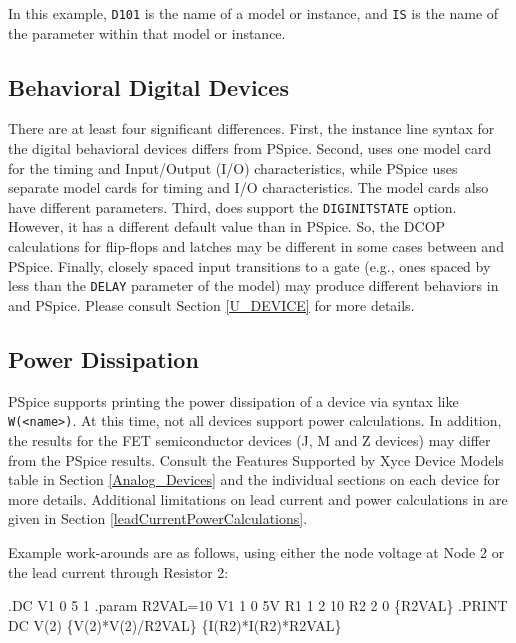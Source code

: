 In this example, \texttt{D101} is the name of a model or instance, 
and \texttt{IS} is the name of the parameter within that model or instance.

\subsection{Behavioral Digital Devices}
There are at least four significant differences.  First, the instance line
syntax for the \Xyce{} digital behavioral devices differs from PSpice.
Second,  \Xyce{} uses one model card for the timing and Input/Output (I/O)
characteristics, while PSpice uses separate model cards for timing and I/O
characteristics.  The model cards also have different parameters. 
Third, \Xyce{} does support the \texttt{DIGINITSTATE} option. However, it has a
different default value than in PSpice.  So, the DCOP calculations for flip-flops and latches may
be different in some cases between \Xyce{} and PSpice.  Finally, closely spaced input
transitions to a gate (e.g., ones spaced by less than the \texttt{DELAY}
parameter of the \Xyce{} model) may produce different behaviors in \Xyce{}
and PSpice.  Please consult Section \ref{U_DEVICE} for more details.

\subsection{Power Dissipation}
PSpice supports printing the power dissipation of a device via syntax like
\texttt{W(<name>)}.  At this time, not all \Xyce{} devices support power calculations. 
In addition, the \Xyce{} results for the FET semiconductor devices (J, M and Z devices) may 
differ from the PSpice results.  Consult the Features Supported by Xyce Device Models table
in Section \ref{Analog_Devices} and the individual sections on each device for more details.  
Additional limitations on lead current and power
calculations in \Xyce{} are given in Section \ref{leadCurrentPowerCalculations}.

Example work-arounds are as follows, using either the
node voltage at Node 2 or the lead current through Resistor 2:

\begin{vquote}
.DC V1 0 5 1
.param R2VAL=10
V1 1 0 5V
R1 1 2 10
R2 2 0 \{R2VAL\}
.PRINT DC V(2) \{V(2)*V(2)/R2VAL\} \{I(R2)*I(R2)*R2VAL\}
\end{vquote}

